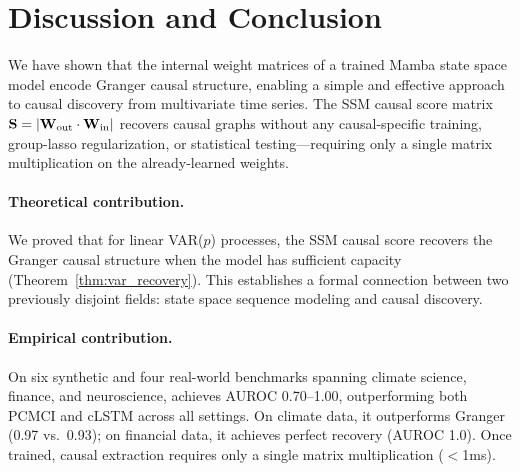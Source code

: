 
\section{Discussion and Conclusion}
\label{sec:conclusion}

We have shown that the internal weight matrices of a trained Mamba state
space model encode Granger causal structure, enabling a simple and
effective approach to causal discovery from multivariate time series. The
SSM causal score matrix $\mathbf{S} = |\mathbf{W}_{\text{out}} \cdot \mathbf{W}_{\text{in}}|$
recovers causal graphs without any causal-specific training, group-lasso
regularization, or statistical testing---requiring only a single matrix
multiplication on the already-learned weights.

\paragraph{Theoretical contribution.}
We proved that for linear VAR($p$) processes, the SSM causal score
recovers the Granger causal structure when the model has sufficient
capacity (Theorem~\ref{thm:var_recovery}). This establishes a formal
connection between two previously disjoint fields: state space sequence
modeling and causal discovery.

\paragraph{Empirical contribution.}
On six synthetic and four real-world benchmarks spanning climate
science, finance, and neuroscience, \methodname{} achieves AUROC
0.70--1.00, outperforming both PCMCI and cLSTM across all settings.
On climate data, it outperforms Granger (0.97 vs.\ 0.93); on
financial data, it achieves perfect recovery (AUROC 1.0). Once
trained, causal extraction requires only a single matrix
multiplication ($<$1ms).

